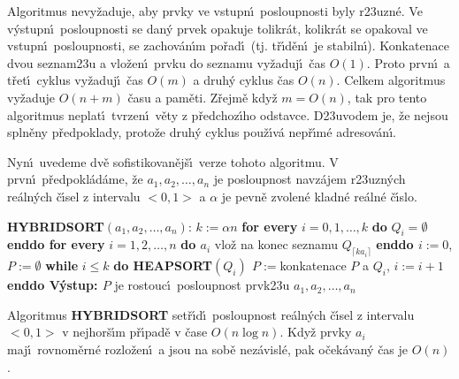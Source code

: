 \flushpar Algoritmus nevy\v zaduje, aby prvky ve 
vstupn\'\i\ posloupnosti by\-ly r\accent23uzn\'e. Ve v\'ystupn\'\i\ 
posloupnosti se dan\'y prvek opakuje tolikr\'at, kolikr\'at se 
opakoval ve vstupn\'\i\ posloupnosti, se zachov\'an\'\i m po\v rad\'\i\ 
(tj. t\v r\'\i d\v en\'\i\ je stabiln\'\i ). 
Konkatenace dvou seznam\accent23u a vlo\v zen\'\i\ prvku do seznamu 
vy\v zaduj\'\i\ \v cas $O(1)$. Proto prvn\'\i\ a t\v ret\'\i\ cyklus vy\v zaduj\'\i\ 
\v cas $O(m)$ a druh\'y cyklus \v cas $O(n)$. Celkem 
algoritmus vy\v zaduje $O(n+m)$ \v casu a pam\v eti. Z\v rejm\v e kdy\v z  
$m=O(n)$, tak pro tento algoritmus neplat\'\i\ tvrzen\'\i\ v\v ety z 
p\v redchoz\'\i ho odstavce. 
D\accent23uvodem je, 
\v ze nejsou spln\v eny p\v redpoklady, proto\v ze druh\'y cyklus 
pou\v z\'\i v\'a nep\v r\'\i m\'e adresov\'an\'\i .
\medskip

\flushpar Nyn\'\i\ uvedeme dv\v e sofistikovan\v ej\v s\'\i\ verze tohoto 
algoritmu. V prvn\'\i\ p\v redpokl\'ad\'ame, \v ze 
$a_1,a_2,\dots,a_n$ je posloupnost navz\'ajem r\accent23uzn\'ych re\'aln\'ych 
\v c\'\i sel z intervalu $<0,1>$ a $\alpha$ je pevn\v e zvolen\'e kladn\'e 
re\'aln\'e \v c\'\i slo.
\medskip

{\bf HYBRIDSORT$(a_1,a_2,\dots,a_n)$}:\newline 
$k:=\alpha n$\newline 
{\bf for every} $i=0,1,\dots,k$ {\bf do} $Q_i=\emptyset$ {\bf enddo\newline 
for every} $i=1,2,\dots,n$ {\bf do\newline 
\phantom{{\rm ---}}$a_i$} vlo\v z na konec seznamu $Q_{\lceil ka_
i\rceil}$\newline 
{\bf enddo\newline 
$i:=0$}, $P:=\emptyset$\newline 
{\bf while} $i\le k$ {\bf do\newline 
\phantom{{\rm ---}}HEAPSORT$(Q_i)$
$P:=$}konkatenace $P$ a $Q_i$, $i:=i+1$\newline 
{\bf enddo\newline 
V\'ystup: $P$} je rostouc\'\i\ posloupnost prvk\accent23u 
$a_1,a_2,\dots,a_n$
\bigskip

Algoritmus {\bf HYBRIDSORT} set\v r\'\i d\'\i\ 
posloupnost re\'al\-n\'ych \v c\'\i sel z intervalu $<0,1>$ v 
nejhor\v s\'\i m p\v r\'\i pad\v e v \v case $O(n\log n)$. Kdy\v z prvky $
a_i$ 
maj\'\i\ rovnom\v ern\'e rozlo\v zen\'\i\ a jsou na sob\v e nez\'a\-visl\'e, 
pak o\v cek\'avan\'y \v cas je $O(n)$.
\endproclaim
\medskip


